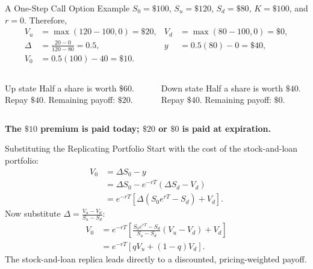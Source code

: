 \documentclass[aspectratio=169,10pt]{beamer}
\begin{document}
\begin{frame}{A One-Step Call Option Example}
  \small
  $S_0=\$100$, $S_u=\$120$, $S_d=\$80$, $K=\$100$, and $r=0$. Therefore,
  \begin{align*}
    V_u&=\max(120-100,0)=\$20, & V_d&=\max(80-100,0)=\$0,\\
    \Delta&=\frac{20-0}{120-80}=0.5, & y&=0.5(80)-0=\$40,\\
    V_0&=0.5(100)-40=\boxed{\$10}.
  \end{align*}
  \begin{columns}[T,onlytextwidth]
    \begin{column}{0.47\textwidth}
      \begin{block}{Up state}
        Half a share is worth $\$60$. Repay $\$40$. Remaining payoff: $\$20$.
      \end{block}
    \end{column}
    \begin{column}{0.47\textwidth}
      \begin{block}{Down state}
        Half a share is worth $\$40$. Repay $\$40$. Remaining payoff: $\$0$.
      \end{block}
    \end{column}
  \end{columns}
  \vspace{0.1cm}
  \centering\textbf{The $\$10$ premium is paid today; $\$20$ or $\$0$ is paid at expiration.}
\end{frame}

\begin{frame}{Substituting the Replicating Portfolio}
  Start with the cost of the stock-and-loan portfolio:
  \begin{align*}
    V_0
      &= \Delta S_0-y\\
      &= \Delta S_0-e^{-rT}(\Delta S_d-V_d)\\
      &= e^{-rT}\left[\Delta(S_0e^{rT}-S_d)+V_d\right].
  \end{align*}
  Now substitute $\displaystyle \Delta=\frac{V_u-V_d}{S_u-S_d}$:
  \begin{align*}
    V_0
      &= e^{-rT}\left[\frac{S_0e^{rT}-S_d}{S_u-S_d}(V_u-V_d)+V_d\right]\\
      &= e^{-rT}\left[qV_u+(1-q)V_d\right].
  \end{align*}
  \centering The stock-and-loan replica leads directly to a discounted, pricing-weighted payoff.
\end{frame}
\end{document}
